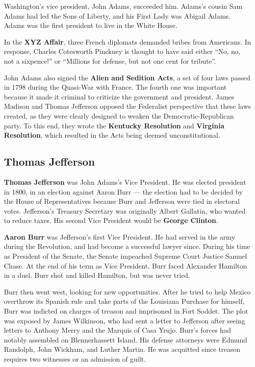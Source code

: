 Washington's vice president, John Adams, succeeded him.
Adams's cousin Sam Adams had led the Sons of Liberty,
and his First Lady was Abigail Adams.
Adams was the first president to live in the White House.

In the \textbf{XYZ Affair}, three French diplomats demanded bribes from Americans.
In response, Charles Cotesworth Pinckney is thought to have said either
``No, no, not a sixpence!'' or ``Millions for defense, but not one cent for tribute''.

John Adams also signed the \textbf{Alien and Sedition Acts},
a set of four laws passed in 1798 during the Quasi-War with France.
The fourth one was important because it made it criminal to criticize the government and president.
James Madison and Thomas Jefferson opposed the Federalist perspective that these laws created,
as they were clearly designed to weaken the Democratic-Republican party.
To this end, they wrote the \textbf{Kentucky Resolution} and \textbf{Virginia Resolution},
which resulted in the Acts being deemed unconstitutional.

\subsection*{Thomas Jefferson}

\textbf{Thomas Jefferson} was John Adams's Vice President.
He was elected president in 1800, in an election against Aaron Burr ---
the election had to be decided by the House of Representatives
because Burr and Jefferson were tied in electoral votes.
Jefferson's Treasury Secretary was originally Albert Gallatin, who wanted to reduce taxes.
His second Vice President would be \textbf{George Clinton}.

\textbf{Aaron Burr} was Jefferson's first Vice President.
He had served in the army during the Revolution, and had become a successful lawyer since.
During his time as President of the Senate, the Senate impeached Supreme Court Justice Samuel Chase.
At the end of his term as Vice President, Burr faced Alexander Hamilton in a duel.
Burr shot and killed Hamilton, but was never tried.

Burr then went west, looking for new opportunities.
After he tried to help Mexico overthrow its Spanish rule and take parts of the Louisiana Purchase for himself,
Burr was indicted on charges of treason and imprisoned in Fort Soddet.
The plot was exposed by James Wilkinson, who had sent a letter to Jefferson
after seeing letters to Anthony Merry and the Marquis of Casa Yrujo.
Burr's forces had notably assembled on Blennerhassett Island.
His defense attorneys were Edmund Randolph, John Wickham, and Luther Martin.
He was acquitted since treason requires two witnesses or an admission of guilt.

